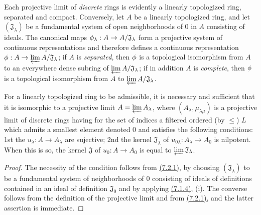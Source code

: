 \begin{env}[7.2.1]
\label{env-0.7.2.1}
Each projective limit of {\em discrete} rings is evidently a linearly
topologized ring, separated and compact. Conversely, let $A$ be a linearly
topologized ring, and let $(\mathfrak{J}_\lambda)$ be a fundamental system of
open neighborhoods of $0$ in $A$ consisting of
ideals. The canonical maps $\phi_\lambda:A\to A/\mathfrak{J}_\lambda$ form
a projective system of continuous representations and therefore defines a
continuous representation $\phi:A\to\varprojlim A/\mathfrak{J}_\lambda$; if $A$
is {\em separated}, then $\phi$ is a topological isomorphism from $A$ to an
everywhere dense subring of $\varprojlim A/\mathfrak{J}_\lambda$; if in
addition $A$ is {\em complete}, then $\phi$ is a topological isomorphism from
$A$ to $\varprojlim A/\mathfrak{J}_\lambda$.
\end{env}

\begin{lem}[7.2.2]
\label{lem-0.7.2.2}
For a linearly topologized ring to be admissible, it is necessary and sufficient
that it is isomorphic to a projective limit $A=\varprojlim A_\lambda$, where
$(A_\lambda,\mu_{\lambda\mu})$ is a projective limit of discrete rings having
for the set of indices a filtered ordered (by $\leqslant$) $L$ which admits
a smallest element denoted $0$ and satisfies the following conditions:
1st the $u_\lambda:A\to A_\lambda$ are sujective;
2nd the kernel $\mathfrak{J}_\lambda$ of
$u_{0\lambda}:A_\lambda\to A_0$ is nilpotent. When this is so, the kernel
$\mathfrak{J}$ of $u_0:A\to A_0$ is equal to $\varprojlim\mathfrak{J}_\lambda$.
\end{lem}

\begin{proof}
\label{proof-lem-0.7.2.2}
The necessity of the condition follows from \hyperref[env-0.7.2.1]{(7.2.1)}, by choosing
$(\mathfrak{J}_\lambda)$ to be a fundamental system of neighborhoods of $0$
consisting of ideals of definitions contained in an ideal of definition
$\mathfrak{J}_0$ and by applying \hyperref[prop-0.7.1.4]{(7.1.4)}, (i). The converse follows
from the definition of the projective limit and from \hyperref[env-0.7.2.1]{(7.2.1)}, and the
latter assertion is immediate.
\end{proof}

